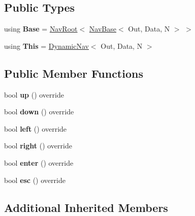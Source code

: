 \subsection*{Public Types}
\begin{DoxyCompactItemize}
\item 
\mbox{\label{classDynamicNav_a07643e4956c551dd6e73113bb64b907c}} 
using {\bfseries Base} = \hyperlink{structNavRoot}{Nav\+Root}$<$ \hyperlink{classNavBase}{Nav\+Base}$<$ Out, Data, N $>$ $>$
\item 
\mbox{\label{classDynamicNav_a87dc6c1f5969829af5e073e6d102c443}} 
using {\bfseries This} = \hyperlink{classDynamicNav}{Dynamic\+Nav}$<$ Out, Data, N $>$
\end{DoxyCompactItemize}
\subsection*{Public Member Functions}
\begin{DoxyCompactItemize}
\item 
\mbox{\label{classDynamicNav_a311f6301899fe8022d1188a41b6d3a3d}} 
bool {\bfseries up} () override
\item 
\mbox{\label{classDynamicNav_af29357e2328551fb6d68b5d0652c5cbb}} 
bool {\bfseries down} () override
\item 
\mbox{\label{classDynamicNav_a056c94a768614ce2290ced9030868c75}} 
bool {\bfseries left} () override
\item 
\mbox{\label{classDynamicNav_a866d57846795b913329ee39fd670d942}} 
bool {\bfseries right} () override
\item 
\mbox{\label{classDynamicNav_a1781e521f7d4e267f5e401c6070667b6}} 
bool {\bfseries enter} () override
\item 
\mbox{\label{classDynamicNav_abfa730037c5dd6f8902d5f76bba9121b}} 
bool {\bfseries esc} () override
\end{DoxyCompactItemize}
\subsection*{Additional Inherited Members}


